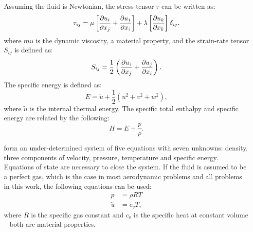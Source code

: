 Assuming the fluid is Newtonian, the stress tensor $\tau$ can be written as:
\begin{equation*}
    \tau_{ij} = \mu \left [
         \frac{\partial u_i}{\partial x_j}  +  \frac{\partial u_j}{\partial x_i} 
    \right ]
    + \lambda \left [
         \frac{\partial u_k}{\partial x_k} 
    \right ] \delta_{ij}.
\end{equation*}
where $mu$ is the dynamic viscosity, a material property, and the strain-rate tensor $S_{ij}$ is defined as:
\begin{equation*}
    S_{ij} = \frac{1}{2}\left(
         \frac{\partial u_i}{\partial x_j}  +  \frac{\partial u_j}{\partial x_i} 
    \right).
\end{equation*}
The specific energy is defined as:
\begin{equation*}
    E = \tilde{u}  + \frac{1}{2}(u^2 + v^2 + w^2),
\end{equation*}
where $\tilde{u}$ is the internal thermal energy.
The specific total enthalpy and specific energy are related by the following:
\begin{equation*}
    H = E + \frac{p}{\rho}.
\end{equation*}

 form an under-determined system of five equations with seven unknowns: density, three components of velocity, pressure, temperature and specific energy. Equations of state are necessary to close the system. If the fluid is assumed to be a perfect gas, which is the case in most aerodynamic problems and all problems in this work, the following equations can be used:
\begin{align}
    p &= \rho R T \label{eq:state1}\\
    \tilde{u} &= c_v T \label{eq:state2},
\end{align}
where $R$ is the specific gas constant and $c_v$ is the specific heat at constant volume -- both are material properties.

